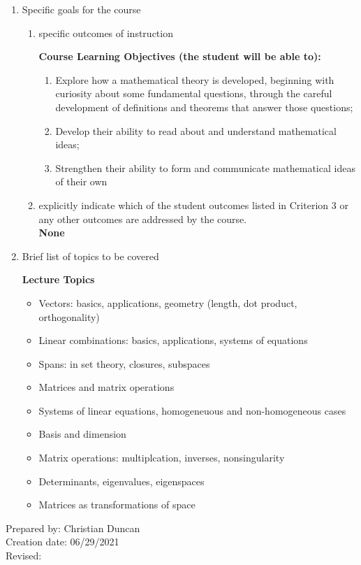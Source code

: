 \begin{enumerate}[1.]
\begin{enumerate}[a.]
\end{enumerate}

\item Specific goals for the course
\begin{enumerate}
\item specific outcomes of instruction\\ %
  {\bfseries
    Course Learning Objectives (the student will be able to):
    \begin{enumerate}[1.]
      \item Explore how a mathematical theory is developed, beginning with curiosity about
      some fundamental questions, through the careful development of definitions and
      theorems that answer those questions;
      \item Develop their ability to read about and understand mathematical ideas;
      \item Strengthen their ability to form and communicate mathematical ideas of their own
      \end{enumerate}
  }

\item explicitly indicate which of the student outcomes listed in Criterion 3 or any other outcomes are addressed by the course.\\
  {\bfseries
    None
  }
\end{enumerate}

\item Brief list of topics to be covered\\
  {\bfseries
    Lecture Topics
    \begin{itemize}
      \item Vectors: basics, applications, geometry (length, dot product, orthogonality)
      \item Linear combinations: basics, applications, systems of equations
      \item Spans: in set theory, closures, subspaces
      \item Matrices and matrix operations
      \item Systems of linear equations, homogeneuous and non-homogeneous cases
      \item Basis and dimension
      \item Matrix operations: multiplcation, inverses, nonsingularity
      \item Determinants, eigenvalues, eigenspaces
      \item Matrices as transformations of space
    \end{itemize}
  }

\end{enumerate}

\noindent Prepared by: Christian Duncan\\
\noindent Creation date: 06/29/2021\\
\noindent Revised:\\
